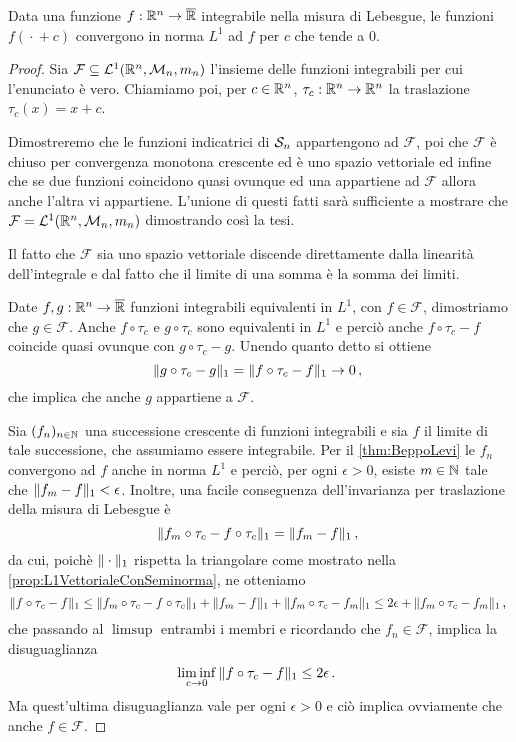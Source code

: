 \begin{proposition}\label{prop:ContinuitaL1}
	Data una funzione $f:\R^n\to\Rbar$ integrabile nella misura di Lebesgue, le funzioni $f({}\cdot{}+c)$ convergono in norma $L^1$ ad $f$ per $c$ che tende a $0$.
\end{proposition}
\begin{proof}
	Sia $\mathcal F\subseteq \L(\R^n,\M_n,m_n)$ l'insieme delle funzioni integrabili per cui l'enunciato è vero.
	Chiamiamo poi, per $c\in\R^n$, $\tau_c:\R^n\to\R^n$ la traslazione $\tau_c(x)=x+c$.
	
	Dimostreremo che le funzioni indicatrici di $\S_n$ appartengono ad $\mathcal F$, poi che $\mathcal F$ è chiuso per convergenza monotona crescente ed è uno spazio vettoriale ed infine che se due funzioni coincidono quasi ovunque ed una appartiene ad $\mathcal F$ allora anche l'altra vi appartiene. 
	L'unione di questi fatti sarà sufficiente a mostrare che $\mathcal F=\L(\R^n,\M_n,m_n)$ dimostrando così la tesi.
	
	Il fatto che $\mathcal F$ sia uno spazio vettoriale discende direttamente dalla linearità dell'integrale e dal fatto che il limite di una somma è la somma dei limiti.
	
	Date $f,g:\R^n\to\Rbar$ funzioni integrabili equivalenti in $L^1$, con $f\in\mathcal F$, dimostriamo che $g\in\mathcal F$. 
	Anche $f\circ\tau_c$ e $g\circ\tau_c$ sono equivalenti in $L^1$ e perciò anche $f\circ\tau_c-f$ coincide quasi ovunque con $g\circ\tau_c-g$.
	Unendo quanto detto si ottiene
	\begin{equation*}
		\LNorm{g\circ\tau_c-g}=\LNorm{f\circ\tau_c-f}\to 0 \virgola
	\end{equation*}
	che implica che anche $g$ appartiene a $\mathcal F$.
	
	Sia $(f_n)_{n\in\N}$ una successione crescente di funzioni integrabili e sia $f$ il limite di tale successione, che assumiamo essere integrabile.
	Per il \cref{thm:BeppoLevi} le $f_n$ convergono ad $f$ anche in norma $L^1$ e perciò, per ogni $\epsilon>0$, esiste $m\in\N$ tale che $\LNorm{f_m-f}<\epsilon$. 
	Inoltre, una facile conseguenza dell'invarianza per traslazione della misura di Lebesgue è 
	\begin{equation*}
		\LNorm{f_m\circ\tau_c-f\circ\tau_c}=\LNorm{f_m-f} \virgola
	\end{equation*}
	da cui, poichè $\LNorm{{}\cdot{}}$ rispetta la triangolare come mostrato nella \cref{prop:L1VettorialeConSeminorma}, ne otteniamo
	\begin{equation*}
		\LNorm{f\circ\tau_c-f}\le \LNorm{f_m\circ\tau_c-f\circ\tau_c}+\LNorm{f_m-f}+\LNorm{f_m\circ\tau_c-f_m} \le 2\epsilon+\LNorm{f_m\circ\tau_c-f_m}\virgola
	\end{equation*}
	che passando al $\limsup$ entrambi i membri e ricordando che $f_n\in\mathcal F$, implica la disuguaglianza
	\begin{equation*}
		\liminf_{c\to 0} \LNorm{f\circ\tau_c-f} \le 2\epsilon \punto
	\end{equation*}
	Ma quest'ultima disuguaglianza vale per ogni $\epsilon>0$ e ciò implica ovviamente che anche $f\in\mathcal F$.
	

\end{proof}
